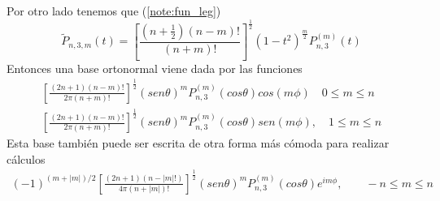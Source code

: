 Por otro lado tenemos que (\hyperref[]{\ref{note:fun_leg}})
$$ 
\tilde{P}_{n,3,m}(t)= \left[\frac{(n+\frac{1}{2})(n-m)!}{(n+m)!}\right]^\frac{1}{2} (1-t^2)^{\frac{m}{2}}P_{n,3}^{(m)}(t)
$$
Entonces una base ortonormal viene dada por las funciones
\begin{gather}
\left[\frac{(2n+1)(n-m)!}{2\pi(n+m)!}\right]^{\frac{1}{2}} (sen\theta)^{m}P_{n,3}^{(m)}(cos\theta)cos(m\phi) \quad 0 \le m \le n \\
\left[\frac{(2n+1)(n-m)!}{2\pi(n+m)!}\right]^{\frac{1}{2}} (sen\theta)^{m}P_{n,3}^{(m)}(cos\theta)sen(m\phi), \quad 1\le m \le n 
\end{gather}
Esta base también puede ser escrita de otra forma más cómoda para realizar cálculos
\begin{gather}
(-1)^{(m+|m|)/2}\left[\frac{(2n+1)(n-|m|!)}{4\pi(n+|m|)!}\right]^{\frac{1}{2}} (sen \theta)^m P_{n,3}^{(m)}(cos\theta)e^{im\phi}, \qquad -n\le m \le n
\end{gather}